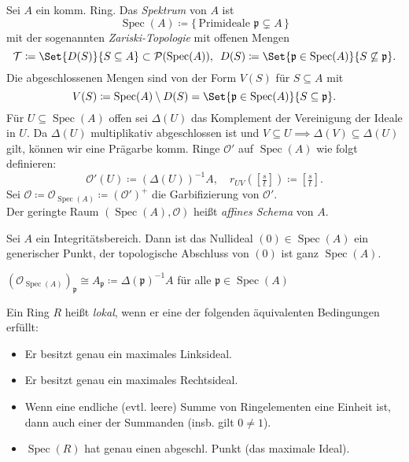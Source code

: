 \documentclass{cheat-sheet}
\renewcommand{\O}{\mathcal{O}} %
\newcommand{\Tau}{\mathcal{T}} %
\DeclareMathOperator{\Spec}{Spec} %
\newcommand{\Pow}{\mathcal{P}} %
\begin{document}
\begin{defn}
  Sei $A$ ein komm. Ring. Das \emph{Spektrum} von $A$ ist
  \[ \Spec(A) \coloneqq \{ \, \text{Primideale $\mathfrak{p} \subsetneq A$} \, \} \]
  mit der sogenannten \emph{Zariski-Topologie} mit offenen Mengen
  \[
    \Tau \coloneqq \Set{D(S)}{S \subseteq A} \subset \Pow(\Spec(A)), \enspace
    D(S) \coloneqq \Set{\mathfrak{p} \in \Spec(A)}{S \not\subseteq \mathfrak{p}}.
  \]
  Die abgeschlossenen Mengen sind von der Form $V(S)$ für $S \subseteq A$ mit
  \[
    V(S) \coloneqq \Spec(A) \setminus D(S) = \Set{\mathfrak{p} \in \Spec(A)}{S \subseteq \mathfrak{p}}.
  \]
  Für $U \subseteq \Spec(A)$ offen sei $\Delta(U)$ das Komplement der Vereinigung der Ideale in $U$.
  Da $\Delta(U)$ multiplikativ abgeschlossen ist und $V \subseteq U \!\implies\! \Delta(V) \subseteq \Delta(U)$ gilt, können wir eine Prägarbe komm. Ringe $\O'$ auf $\Spec(A)$ wie folgt definieren:
  \[
    \O'(U) \coloneqq (\Delta(U))^{-1} A, \quad
    r_{UV}(\left[\tfrac{s}{t}\right]) \coloneqq \left[\tfrac{s}{t}\right].
  \]
  Sei $\O \coloneqq \O_{\Spec(A)} \coloneqq (\O')^+$ die Garbifizierung von $\O'$. \\
  Der geringte Raum $(\Spec(A), \O)$ heißt \emph{affines Schema} von $A$.
\end{defn}

\begin{bem}
  Sei $A$ ein Integritätsbereich. Dann ist das Nullideal $(0) \in \Spec(A)$ ein generischer Punkt, \dh{} der topologische Abschluss von $(0)$ ist ganz $\Spec(A)$.
\end{bem}

\begin{lem}
  $(\O_{\Spec(A)})_{\mathfrak{p}} \cong A_{\mathfrak{p}} \coloneqq \Delta(\mathfrak{p})^{-1} A$ für alle $\mathfrak{p} \in \Spec(A)$
\end{lem}


\begin{defn}
  Ein Ring $R$ heißt \emph{lokal}, wenn er eine der folgenden äquivalenten Bedingungen erfüllt:
  \begin{itemize}
    \item Er besitzt genau ein maximales Linksideal.
    \item Er besitzt genau ein maximales Rechtsideal.
    \item Wenn eine endliche (evtl. leere) Summe von Ringelementen eine Einheit ist, dann auch einer der Summanden (insb. gilt $0 \not= 1$).
    \item $\Spec(R)$ hat genau einen abgeschl. Punkt (das maximale Ideal).
  \end{itemize}
\end{defn}
\end{document}
